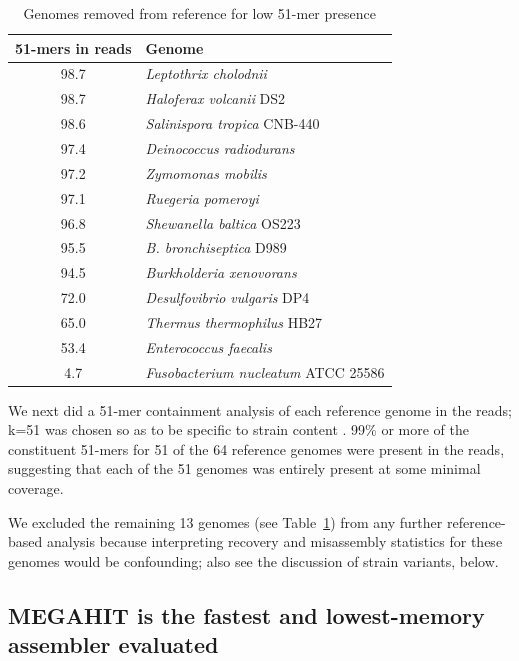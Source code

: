 \documentclass[11pt]{article}
\begin{document}
\begin{table}[t]
\caption{Genomes removed from reference for low 51-mer presence}
\centering
\begin{tabular}{|c|l|}
\hline

\textbf{51-mers in reads}& \textbf{Genome} \\ [0.5ex] %
\hline
98.7 & { \small \em Leptothrix cholodnii } \\ \hline
98.7 & { \small \em Haloferax volcanii} DS2  \\ \hline
98.6 & { \small \em Salinispora tropica} CNB-440 \\ \hline
97.4 & { \small \em Deinococcus radiodurans } \\ \hline
97.2 & { \small \em Zymomonas mobilis } \\ \hline
97.1 & { \small \em Ruegeria pomeroyi } \\ \hline
96.8 & { \small \em Shewanella baltica} OS223  \\ \hline
95.5 & { \small \em B. bronchiseptica} D989  \\ \hline
94.5 & { \small \em Burkholderia xenovorans } \\ \hline
72.0 & { \small \em Desulfovibrio vulgaris} DP4  \\ \hline
65.0 & { \small \em Thermus thermophilus} HB27  \\ \hline
53.4 & { \small \em Enterococcus faecalis } \\ \hline
4.7 & { \small \em Fusobacterium nucleatum} ATCC 25586  \\ \hline
\end{tabular}
\label{table:51mer_remove}
\end{table}


We next did a 51-mer containment analysis of each reference genome in
the reads; k=51 was chosen so as to be specific to strain content
\cite{metapalette}.  99\% or more of the constituent 51-mers for 51 of
the 64 reference genomes were present in the reads, suggesting that
each of the 51 genomes was entirely present at some minimal coverage.

We excluded the remaining 13 genomes (see
Table~\ref{table:51mer_remove}) from any further reference-based
analysis because interpreting recovery and misassembly statistics for
these genomes would be confounding; also see the discussion of strain
variants, below.

\subsection*{MEGAHIT is the fastest and lowest-memory assembler evaluated}
\end{document}
